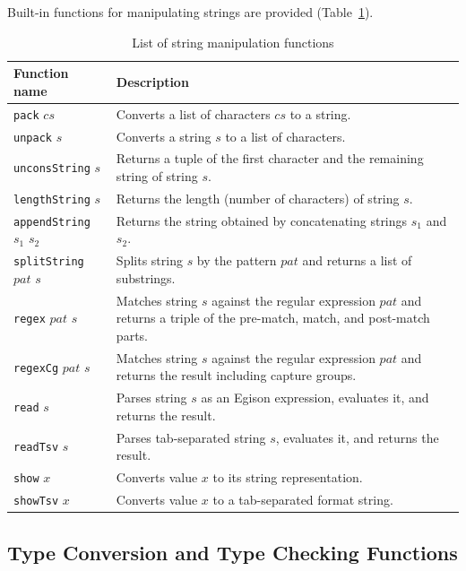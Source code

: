 Built-in functions for manipulating strings are provided (Table~\ref{tab:stringFunctions}).

\begin{table}[h]
  \begin{center}
    \begin{tabular}{ | l | p{9cm} |}
    \hline
    Function name & Description \\ \hline
    \texttt{pack} $cs$ & Converts a list of characters $cs$ to a string. \\ \hline
    \texttt{unpack} $s$ & Converts a string $s$ to a list of characters. \\ \hline
    \texttt{unconsString} $s$ & Returns a tuple of the first character and the remaining string of string $s$. \\ \hline
    \texttt{lengthString} $s$ & Returns the length (number of characters) of string $s$. \\ \hline
    \texttt{appendString} $s_1$ $s_2$ & Returns the string obtained by concatenating strings $s_1$ and $s_2$. \\ \hline
    \texttt{splitString} $pat$ $s$ & Splits string $s$ by the pattern $pat$ and returns a list of substrings. \\ \hline
    \texttt{regex} $pat$ $s$ & Matches string $s$ against the regular expression $pat$ and returns a triple of the pre-match, match, and post-match parts. \\ \hline
    \texttt{regexCg} $pat$ $s$ & Matches string $s$ against the regular expression $pat$ and returns the result including capture groups. \\ \hline
    \texttt{read} $s$ & Parses string $s$ as an Egison expression, evaluates it, and returns the result. \\ \hline
    \texttt{readTsv} $s$ & Parses tab-separated string $s$, evaluates it, and returns the result. \\ \hline
    \texttt{show} $x$ & Converts value $x$ to its string representation. \\ \hline
    \texttt{showTsv} $x$ & Converts value $x$ to a tab-separated format string. \\ \hline
    \end{tabular}
\end{center}
    \caption{List of string manipulation functions}
    \label{tab:stringFunctions}
\end{table}

\subsection{Type Conversion and Type Checking Functions}

